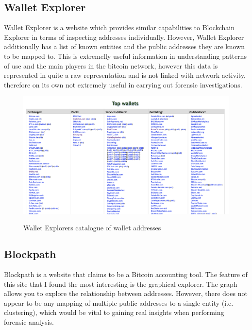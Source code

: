 \subsection{Wallet Explorer}
Wallet Explorer is a website which provides similar capabilities to Blockchain Explorer in terms of inspecting addresses individually. However, Wallet Explorer additionally has a list of known entities and the public addresses they are known to be mapped to. This is extremelly useful information in understanding patterns of use and the main players in the bitcoin network, however this data is represented in quite a raw representation and is not linked with network activity, therefore on its own not extremely useful in carrying out forensic investigations.

\begin{figure}[h!]
  \centering
  \includegraphics[width = 15cm]{./figures/walletexplorer}\\[0.5cm] 
  \caption{Wallet Explorers catalogue of wallet addresses \protect \footnotemark}
\end{figure}
\subsection{Blockpath} 
Blockpath is a website that claims to be a Bitcoin accounting tool. The feature of this site that I found the most interesting is the graphical explorer. The graph allows you to explore the relationship between addresses. However, there does not appear to be any mapping of multiple public addresses to a single entity (i.e. clustering), which would be vital to gaining real insights when performing forensic analysis.  

